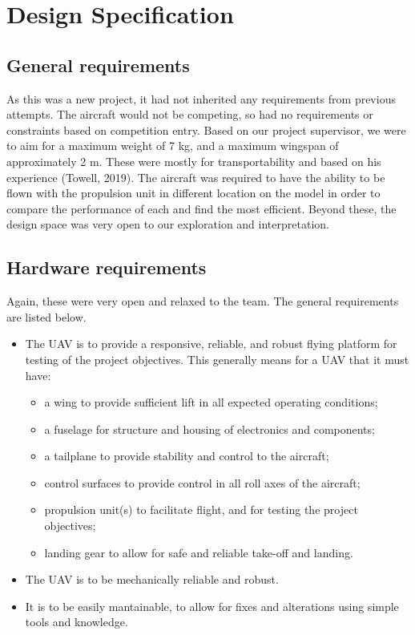 \documentclass[../../main.tex]{subfiles}
\begin{document}
\chapter{Design Specification} \label{chapter:design-specification}

\section{General requirements} \label{sec:design-specification:general-requirements}

As this was a new project, it had not inherited any requirements from previous attempts. 
The aircraft would not be competing, so had no requirements or constraints based on competition entry. 
Based on our project supervisor, we were to aim for a maximum weight of 7 kg, and a maximum wingspan of approximately 2 m.
These were mostly for transportability and based on his experience (Towell, 2019).  %
The aircraft was required to have the ability to be flown with the propulsion unit in different location on the model in order to compare the performance of each and find the most efficient. 
Beyond these, the design space was very open to our exploration and interpretation. 

\section{Hardware requirements} \label{sec:design-specification:hardware-requirements}

Again, these were very open and relaxed to the team.
The general requirements are listed below.

\begin{itemize}
    \item The UAV is to provide a responsive, reliable, and robust flying platform for testing of the project objectives.
        This generally means for a UAV that it must have:
        \begin{itemize}
            \item a wing to provide sufficient lift in all expected operating conditions;
            \item a fuselage for structure and housing of electronics and components;
            \item a tailplane to provide stability and control to the aircraft;
            \item control surfaces to provide control in all roll axes of the aircraft;
            \item propulsion unit(s) to facilitate flight, and for testing the project objectives;
            \item landing gear to allow for safe and reliable take-off and landing.
        \end{itemize}
    \item The UAV is to be mechanically reliable and robust.
    \item It is to be easily mantainable, to allow for fixes and alterations using simple tools and knowledge.
\end{itemize}
\end{document}
